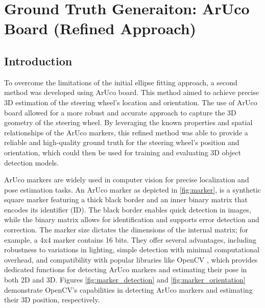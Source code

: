 \chapter{Ground Truth Generaiton: ArUco Board (Refined Approach)}

\section{Introduction}
To overcome the limitations of the initial ellipse fitting 
approach, a second method was developed using ArUco board. This method aimed to achieve precise 3D 
estimation of the steering wheel's location and orientation. 
The use of ArUco board allowed for a more robust and accurate approach to capture the 3D 
geometry of the steering wheel. By leveraging the known 
properties and spatial relationships of the ArUco markers, 
this refined method was able to provide a reliable and 
high-quality ground truth for the steering wheel's position 
and orientation, which could then be used for training and 
evaluating 3D object detection models.

ArUco markers \cite{opencv_aruco_detection} are widely used  in 
computer vision for precise localization and pose estimation 
tasks.  An ArUco marker as depicted in \cref{fig:marker}, is a 
synthetic square marker featuring a  thick black border and an 
inner binary matrix that encodes  its identifier (ID). The black 
border enables quick detection  in images, while the binary 
matrix allows for identification  and supports error detection 
and correction.  The marker size dictates the dimensions of the 
internal matrix;  for example, a 4x4 marker contains 16 bits. They offer 
several advantages, including robustness to  variations in 
lighting, simple detection with minimal  computational overhead, 
and compatibility with popular  libraries like OpenCV \cite{opencv_library}, which 
provides dedicated functions for detecting ArUco markers and 
estimating their pose in both 2D  and 3D. Figures \cref{fig:marker_detection} and \cref{fig:marker_orientation} 
demonstrate OpenCV's capabilities in detecting ArUco markers and 
estimating their 3D position, respectively. 

